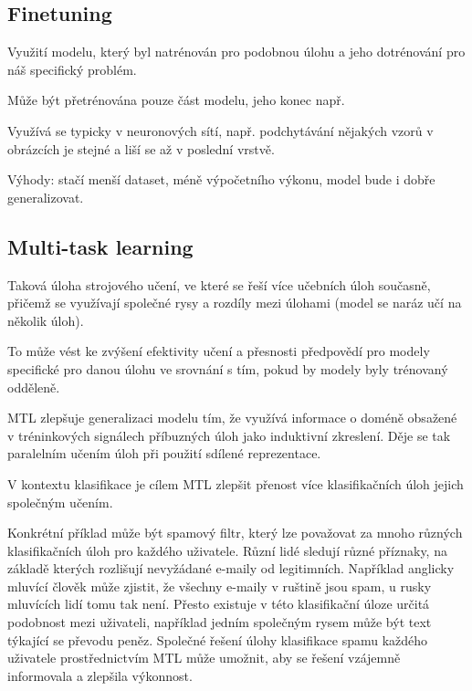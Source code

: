 \subsection{Finetuning}

\begin{compactitem}
    \item Využití modelu, který byl natrénován pro podobnou úlohu a jeho dotrénování pro náš specifický problém.
    \begin{compactitem}
        \item Může být přetrénována pouze část modelu, jeho konec např.
    \end{compactitem}

    \item Využívá se typicky v neuronových sítí, např. podchytávání nějakých vzorů v obrázcích je stejné a liší se až v poslední vrstvě.

    \item Výhody: stačí menší dataset, méně výpočetního výkonu, model bude i dobře generalizovat.
\end{compactitem}

\subsection{Multi-task learning}

\begin{compactitem}
    \item Taková úloha strojového učení, ve které se řeší více učebních úloh současně, přičemž se využívají společné rysy a rozdíly mezi úlohami (model se naráz učí na několik úloh).

    \item To může vést ke zvýšení efektivity učení a přesnosti předpovědí pro modely specifické pro danou úlohu ve srovnání s tím, pokud by modely byly trénovaný odděleně.

    \item MTL zlepšuje generalizaci modelu tím, že využívá informace o doméně obsažené v tréninkových signálech příbuzných úloh jako induktivní zkreslení. Děje se tak paralelním učením úloh při použití sdílené reprezentace.

    \item V kontextu klasifikace je cílem MTL zlepšit přenost více klasifikačních úloh jejich společným učením.
    \begin{compactitem}
        \item Konkrétní příklad může být spamový filtr, který lze považovat za mnoho různých klasifikačních úloh pro každého uživatele. Různí lidé sledují různé příznaky, na základě kterých rozlišují nevyžádané e-maily od legitimních. Například anglicky mluvící člověk může zjistit, že všechny e-maily v ruštině jsou spam, u rusky mluvících lidí tomu tak není. Přesto existuje v této klasifikační úloze určitá podobnost mezi uživateli, například jedním společným rysem může být text týkající se převodu peněz. Společné řešení úlohy klasifikace spamu každého uživatele prostřednictvím MTL může umožnit, aby se řešení vzájemně informovala a zlepšila výkonnost.
    \end{compactitem}
\end{compactitem}

